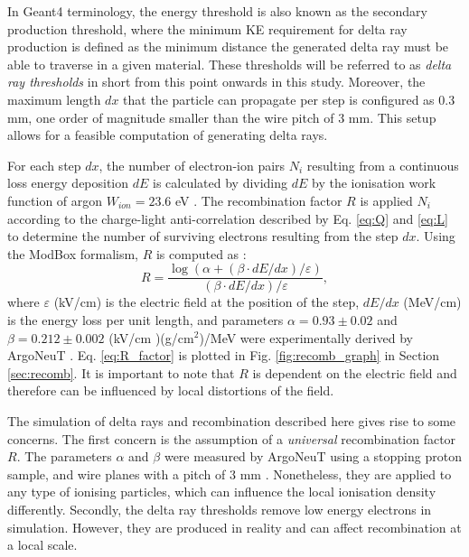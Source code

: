 In Geant4 terminology, the energy threshold is also known as the secondary production threshold, where the minimum KE requirement for delta ray production is defined as the minimum distance the generated delta ray must be able to traverse in a given material. 
These thresholds will be referred to as \textit{delta ray thresholds} in short from this point onwards in this study. 
Moreover, the maximum length $dx$ that the particle can propagate per step is configured as 0.3 mm, one order of magnitude smaller than the wire pitch of 3 mm.
This setup allows for a feasible computation of generating delta rays.

For each step $dx$, the number of electron-ion pairs $N_i$ resulting from a continuous loss energy deposition $dE$ is calculated by dividing $dE$ by the ionisation work function of argon $W_{ion} = 23.6$ eV \cite{wion_lar}.
The recombination factor $R$ is applied $N_i$ according to the charge-light anti-correlation described by Eq. \ref{eq:Q} and \ref{eq:L} to determine the number of surviving electrons resulting from the step $dx$.    
Using the ModBox formalism, $R$ is computed as \cite{argoneut_recomb}:
\begin{equation}
        \label{eq:R_factor}
        R = \frac{\log{ \left( \alpha + \left(\beta \cdot dE/dx\right)/\varepsilon \right)}}{\left(\beta \cdot dE/dx\right)/\varepsilon},
\end{equation}
where $\varepsilon$ (kV/cm) is the electric field at the position of the step, $dE/dx$ (MeV/cm) is the energy loss per unit length, and parameters $\alpha = 0.93\pm0.02$ and $\beta = 0.212\pm0.002$ (kV/cm
)(g/cm$^{2}$)/MeV were experimentally derived by ArgoNeuT \cite{argoneut_recomb}.
Eq. \ref{eq:R_factor} is plotted in Fig. \ref{fig:recomb_graph} in Section \ref{sec:recomb}.
It is important to note that $R$ is dependent on the electric field and therefore can be influenced by local distortions of the field.

The simulation of delta rays and recombination described here gives rise to some concerns.
The first concern is the assumption of a \textit{universal} recombination factor $R$.
The parameters $\alpha$ and $\beta$ were measured by ArgoNeuT using a stopping proton sample, and wire planes with a pitch of 3 mm \cite{argoneut_recomb}.
Nonetheless, they are applied to any type of ionising particles, which can influence the local ionisation density differently. 
Secondly, the delta ray thresholds remove low energy electrons in simulation.
However, they are produced in reality and can affect recombination at a local scale. 

